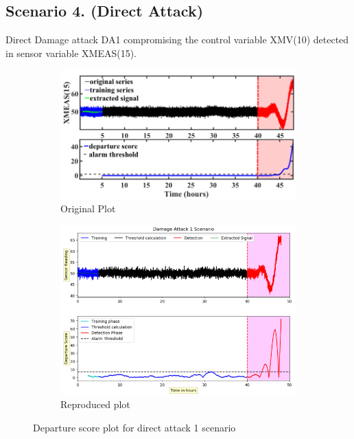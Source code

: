 \subsection*{Scenario 4. (Direct Attack)}

Direct Damage attack DA1 compromising the control variable XMV(10) detected in sensor variable XMEAS(15).

\begin{figure}[H]	
	\centering
	\begin{subfigure}[t]{0.45\textwidth}
		\centering
		\includegraphics[width=\textwidth]{imgs/da1orig.png}
		\caption{Original Plot}\label{fig:1a}		
	\end{subfigure}
	\qquad
	\begin{subfigure}[t]{0.45\textwidth}
		\centering
		\includegraphics[width=\textwidth]{imgs/da1re.png}
		\caption{Reproduced plot}\label{fig:1b}
	\end{subfigure}
	\caption{Departure score plot for direct attack 1 scenario}\label{fig:1}
\end{figure}

